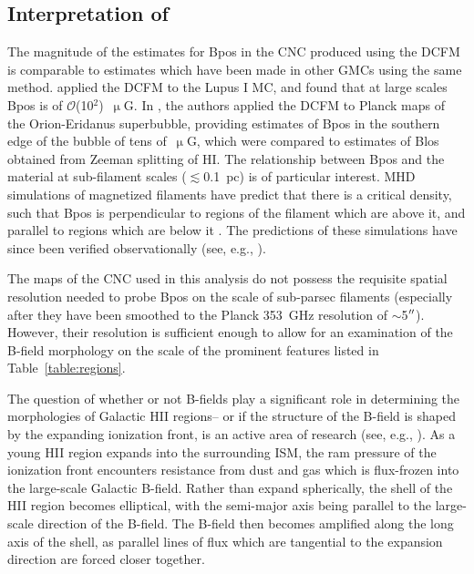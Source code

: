 \subsection{Interpretation of }\label{interpreting Bpos}

The magnitude of the estimates for \gls{Bpos} in the CNC produced using the DCFM is comparable to estimates which have been made in other GMCs using the same method. \citet{franco2015tracing} applied the DCFM to the Lupus I MC, and found that at large scales \gls{Bpos} is of $\mathcal{O}$(10$^{2}$)~$\upmu$G. In \citet{soler2018magnetic}, the authors applied the DCFM to Planck maps of the Orion-Eridanus superbubble, providing estimates of \gls{Bpos} in the southern edge of the bubble of tens of~$\upmu$G, which were compared to estimates of \gls{Blos} obtained from Zeeman splitting of HI. The relationship between \gls{Bpos} and the material at sub-filament scales ($\lesssim$0.1~pc) is of particular interest. MHD simulations of magnetized filaments have predict that there is a critical density, such that \gls{Bpos} is perpendicular to regions of the filament which are above it, and parallel to regions which are below it \citep{soler2013imprint}. The predictions of these simulations have since been verified observationally (see, e.g., \citet{ade2016planck,soler2017relation,fissel2018relative}).

The maps of the CNC used in this analysis do not possess the requisite spatial resolution needed to probe \gls{Bpos} on the scale of sub-parsec filaments (especially after they have been smoothed to the Planck 353~GHz resolution of $\sim$5$\operatorname{^{\prime\prime}}$). However, their resolution is sufficient enough to allow for an examination of the B-field morphology on the scale of the prominent features listed in Table~\ref{table:regions}.

The question of whether or not B-fields play a significant role in determining the morphologies of Galactic HII regions-- or if the structure of the B-field is shaped by the expanding ionization front, is an active area of research (see, e.g., \citet{churchwell2006bubbling,gendelev2012evolution,anderson2012dust,pavel2012h,tremblin2014age,pellegrini2007magnetically}). As a young HII region expands into the surrounding ISM, the ram pressure of the ionization front encounters resistance from dust and gas which is flux-frozen into the large-scale Galactic B-field. Rather than expand spherically, the shell of the HII region becomes elliptical, with the semi-major axis being parallel to the large-scale direction of the B-field. The B-field then becomes amplified along the long axis of the shell, as parallel lines of flux which are tangential to the expansion direction are forced closer together.

